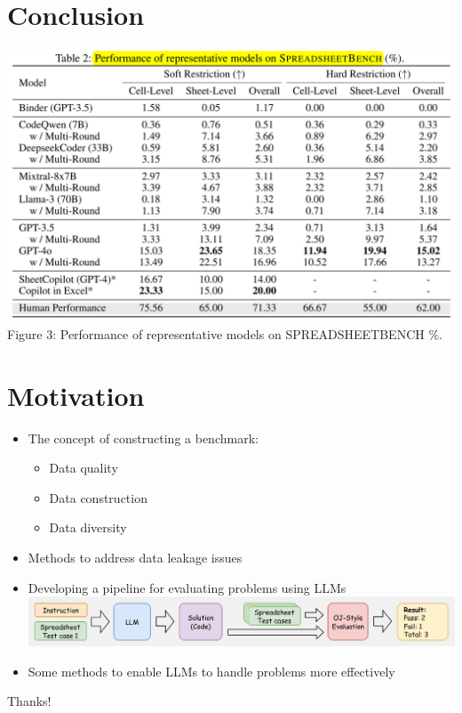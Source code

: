 \documentclass{beamer}
\begin{document}
\section{Conclusion}
\begin{frame}
    \centering
    \includegraphics[width=1\linewidth]{pic/performance.jpg}
    \vspace{0.2cm}
    {\footnotesize Figure 3: Performance of representative models on SPREADSHEETBENCH \(\%\).}
\end{frame}

\section{Motivation}

\begin{frame}
    \begin{itemize}
        \item The concept of constructing a benchmark:
        \begin{itemize}
            \item Data quality
            \item Data construction
            \item Data diversity
        \end{itemize}
        \item Methods to address data leakage issues
        \item Developing a pipeline for evaluating problems using LLMs
        \includegraphics[width=1\linewidth]{pic/OJ Evaluation pipeline.jpg}
        \item Some methods to enable LLMs to handle problems more effectively
    \end{itemize}
\end{frame}

\begin{frame}
    \begin{center}
        {\Huge\calligra Thanks!}
    \end{center}
\end{frame}
\end{document}

